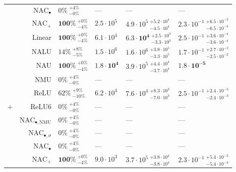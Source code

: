 \begin{longtable}{crllll}
 & $\mathrm{NAC}_{\bullet}$ & $0\% {~}^{+4\%}_{-0\%}$ & --- & --- & ---\\

 & $\mathrm{NAC}_{+}$ & $\mathbf{100\%} {~}^{+0\%}_{-4\%}$ & $2.5 \cdot 10^{5}$ & $4.9 \cdot 10^{5} {~}^{+5.2 \cdot 10^{4}}_{-4.5 \cdot 10^{4}}$ & $2.3 \cdot 10^{-1} {~}^{+6.5 \cdot 10^{-3}}_{-6.5 \cdot 10^{-3}}$\\

 & Linear & $\mathbf{100\%} {~}^{+0\%}_{-4\%}$ & $6.1 \cdot 10^{4}$ & $\mathbf{6.3 \cdot 10^{4}} {~}^{+2.5 \cdot 10^{3}}_{-3.3 \cdot 10^{3}}$ & $2.5 \cdot 10^{-1} {~}^{+3.6 \cdot 10^{-4}}_{-3.6 \cdot 10^{-4}}$\\

 & NALU & $14\% {~}^{+8\%}_{-5\%}$ & $1.5 \cdot 10^{6}$ & $1.6 \cdot 10^{6} {~}^{+3.8 \cdot 10^{5}}_{-3.3 \cdot 10^{5}}$ & $1.7 \cdot 10^{-1} {~}^{+2.7 \cdot 10^{-2}}_{-2.5 \cdot 10^{-2}}$\\

 & NAU & $\mathbf{100\%} {~}^{+0\%}_{-4\%}$ & $\mathbf{1.8 \cdot 10^{4}}$ & $3.9 \cdot 10^{5} {~}^{+4.4 \cdot 10^{4}}_{-3.7 \cdot 10^{4}}$ & $\mathbf{1.8 \cdot 10^{-5}}$\\

 & NMU & $0\% {~}^{+4\%}_{-0\%}$ & --- & --- & ---\\

 & ReLU & $62\% {~}^{+9\%}_{-10\%}$ & $6.2 \cdot 10^{4}$ & $7.6 \cdot 10^{4} {~}^{+8.3 \cdot 10^{3}}_{-7.0 \cdot 10^{3}}$ & $2.5 \cdot 10^{-1} {~}^{+2.4 \cdot 10^{-3}}_{-2.4 \cdot 10^{-3}}$\\

\multirow{-10}{*}{\centering\arraybackslash $\bm{+}$} & ReLU6 & $0\% {~}^{+4\%}_{-0\%}$ & --- & --- & ---\\
\cmidrule{1-6}
 & $\mathrm{NAC}_{\bullet,\mathrm{NMU}}$ & $0\% {~}^{+4\%}_{-0\%}$ & --- & --- & ---\\

 & $\mathrm{NAC}_{\bullet,\sigma}$ & $0\% {~}^{+4\%}_{-0\%}$ & --- & --- & ---\\

 & $\mathrm{NAC}_{\bullet}$ & $0\% {~}^{+4\%}_{-0\%}$ & --- & --- & ---\\

 & $\mathrm{NAC}_{+}$ & $\mathbf{100\%} {~}^{+0\%}_{-4\%}$ & $9.0 \cdot 10^{3}$ & $3.7 \cdot 10^{5} {~}^{+3.8 \cdot 10^{4}}_{-3.8 \cdot 10^{4}}$ & $2.3 \cdot 10^{-1} {~}^{+5.4 \cdot 10^{-3}}_{-5.4 \cdot 10^{-3}}$\\


\end{longtable}
